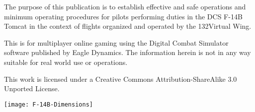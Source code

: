 The purpose of this publication is to establish effective and safe operations
and minimum operating procedures for pilots performing duties in the DCS F-14B
Tomcat in the context of flights organized and operated by the 132\nd Virtual
Wing.

This is for multiplayer online gaming using the Digital Combat Simulator
software published by Eagle Dynamics. The information herein is not in any way
suitable for real world use or operations.

This work is licensed under a Creative Commons Attribution-ShareAlike 3.0
Unported License.

\texttt{[image: F-14B-Dimensions]}
